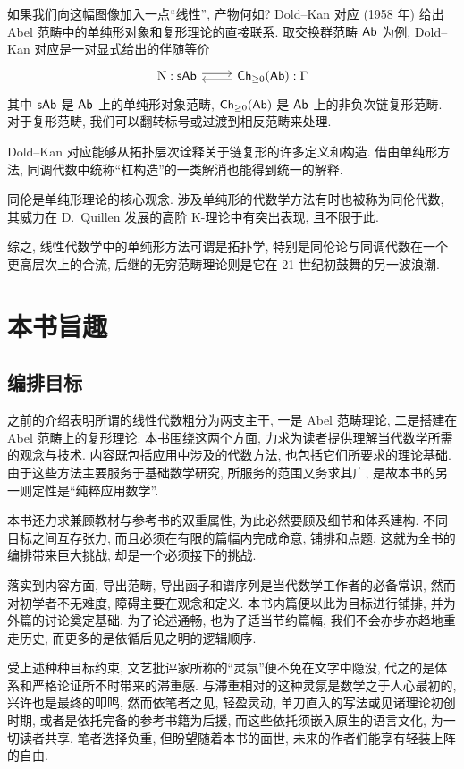 如果我们向这幅图像加入一点``线性'', 产物何如? Dold--Kan 对应 (1958 年) 给出 Abel 范畴中的单纯形对象和复形理论的直接联系. 取交换群范畴 $\mathsf{Ab}$ 为例, Dold--Kan 对应是一对显式给出的伴随等价
\[\begin{tikzcd}
	\mathrm{N}: \cate{sAb} \arrow[shift left, r] & \cate{Ch}_{\geq 0}(\cate{Ab}): \Gamma \arrow[shift left, l]
\end{tikzcd}\]
其中 $\mathsf{sAb}$ 是 $\mathsf{Ab}$ 上的单纯形对象范畴, $\mathsf{Ch}_{\geq 0}(\mathsf{Ab})$ 是 $\mathsf{Ab}$ 上的非负次链复形范畴. 对于复形范畴, 我们可以翻转标号或过渡到相反范畴来处理.

Dold--Kan 对应能够从拓扑层次诠释关于链复形的许多定义和构造. 借由单纯形方法, 同调代数中统称``杠构造''的一类解消也能得到统一的解释.

同伦是单纯形理论的核心观念. 涉及单纯形的代数学方法有时也被称为同伦代数, 其威力在 D.\ Quillen 发展的高阶 K-理论中有突出表现, 且不限于此.

综之, 线性代数学中的单纯形方法可谓是拓扑学, 特别是同伦论与同调代数在一个更高层次上的合流, 后继的无穷范畴理论则是它在 21 世纪初鼓舞的另一波浪潮.

\section*{本书旨趣}
\subsection*{编排目标}
之前的介绍表明所谓的线性代数粗分为两支主干, 一是 Abel 范畴理论, 二是搭建在 Abel 范畴上的复形理论. 本书围绕这两个方面, 力求为读者提供理解当代数学所需的观念与技术. 内容既包括应用中涉及的代数方法, 也包括它们所要求的理论基础. 由于这些方法主要服务于基础数学研究, 所服务的范围又务求其广, 是故本书的另一则定性是``纯粹应用数学''.

本书还力求兼顾教材与参考书的双重属性, 为此必然要顾及细节和体系建构. 不同目标之间互存张力, 而且必须在有限的篇幅内完成命意, 铺排和点题, 这就为全书的编排带来巨大挑战, 却是一个必须接下的挑战.

落实到内容方面, 导出范畴, 导出函子和谱序列是当代数学工作者的必备常识, 然而对初学者不无难度, 障碍主要在观念和定义. 本书内篇便以此为目标进行铺排, 并为外篇的讨论奠定基础. 为了论述通畅, 也为了适当节约篇幅, 我们不会亦步亦趋地重走历史, 而更多的是依循后见之明的逻辑顺序.

受上述种种目标约束, 文艺批评家所称的``灵氛''便不免在文字中隐没, 代之的是体系和严格论证所不时带来的滞重感. 与滞重相对的这种灵氛是数学之于人心最初的, 兴许也是最终的叩鸣, 然而依笔者之见, 轻盈灵动, 单刀直入的写法或见诸理论初创时期, 或者是依托完备的参考书籍为后援, 而这些依托须嵌入原生的语言文化, 为一切读者共享. 笔者选择负重, 但盼望随着本书的面世, 未来的作者们能享有轻装上阵的自由.

